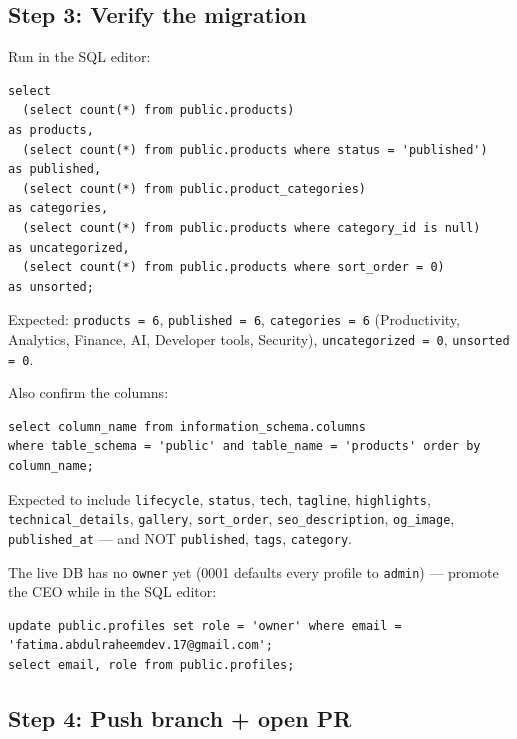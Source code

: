 \documentclass[11pt,a4paper]{article}
\begin{document}
\subsection*{Step 3: Verify the migration}

Run in the SQL editor:

\begin{lstlisting}
select
  (select count(*) from public.products)                                   as products,
  (select count(*) from public.products where status = 'published')        as published,
  (select count(*) from public.product_categories)                         as categories,
  (select count(*) from public.products where category_id is null)         as uncategorized,
  (select count(*) from public.products where sort_order = 0)              as unsorted;
\end{lstlisting}

Expected: \texttt{products = 6}, \texttt{published = 6}, \texttt{categories = 6} (Productivity,
Analytics, Finance, AI, Developer tools, Security), \texttt{uncategorized = 0},
\texttt{unsorted = 0}.

Also confirm the columns:

\begin{lstlisting}
select column_name from information_schema.columns
where table_schema = 'public' and table_name = 'products' order by column_name;
\end{lstlisting}

Expected to include \texttt{lifecycle}, \texttt{status}, \texttt{tech}, \texttt{tagline},
\texttt{highlights}, \texttt{technical\_details}, \texttt{gallery}, \texttt{sort\_order},
\texttt{seo\_description}, \texttt{og\_image}, \texttt{published\_at} --- and NOT
\texttt{published}, \texttt{tags}, \texttt{category}.

The live DB has no \texttt{owner} yet (0001 defaults every profile to \texttt{admin}) ---
promote the CEO while in the SQL editor:

\begin{lstlisting}
update public.profiles set role = 'owner' where email = 'fatima.abdulraheemdev.17@gmail.com';
select email, role from public.profiles;
\end{lstlisting}

\subsection*{Step 4: Push branch + open PR}
\end{document}
